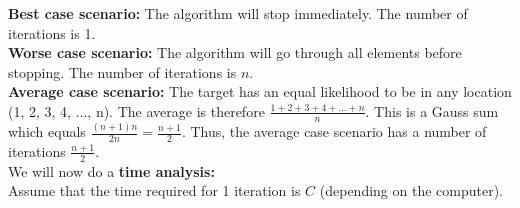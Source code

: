 \documentclass[]{article}
\begin{document}
\textbf{Best case scenario:} The algorithm will stop immediately. The number of iterations is 1.\\

\textbf{Worse case scenario:} The algorithm will go through all elements before stopping. The number of iterations is $n$.\\

\textbf{Average case scenario:} The target has an equal likelihood to be in any location (1, 2, 3, 4, ..., n). The average is therefore $\frac{1+2+3+4+...+n}{n}$. This is a Gauss sum which equals $\frac{(n+1)n}{2n} = \frac{n+1}{2}$. Thus, the average case scenario has a number of iterations $\frac{n+1}{2}$.\\


We will now do a \textbf{time analysis:}\\

Assume that the time required for 1 iteration is $C$ (depending on the computer).\\
\end{document}

